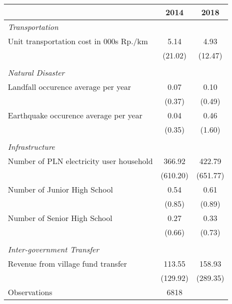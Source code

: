 \begin{tabular}{l*{2}{c}}
\hline\hline
                    &        2014&        2018\\
\hline
\emph{Transportation}&            &            \\
\hspace{0.25cm} Unit transportation cost in 000s Rp./km&        5.14&        4.93\\
                    &     (21.02)&     (12.47)\\
\vspace{0.05em} \\ \emph{Natural Disaster}&            &            \\
\hspace{0.25cm} Landfall occurence average per year&        0.07&        0.10\\
                    &      (0.37)&      (0.49)\\
\hspace{0.25cm} Earthquake occurence average per year&        0.04&        0.46\\
                    &      (0.35)&      (1.60)\\
\vspace{0.05em} \\ \emph{Infrastructure}&            &            \\
\hspace{0.25cm} Number of PLN electricity user household&      366.92&      422.79\\
                    &    (610.20)&    (651.77)\\
\hspace{0.25cm} Number of Junior High School&        0.54&        0.61\\
                    &      (0.85)&      (0.89)\\
\hspace{0.25cm} Number of Senior High School&        0.27&        0.33\\
                    &      (0.66)&      (0.73)\\
\vspace{0.05em} \\ \emph{Inter-government Transfer}&            &            \\
\hspace{0.25cm} Revenue from village fund transfer&      113.55&      158.93\\
                    &    (129.92)&    (289.35)\\
\hline
Observations        &        6818&            \\
\hline\hline
\end{tabular}
